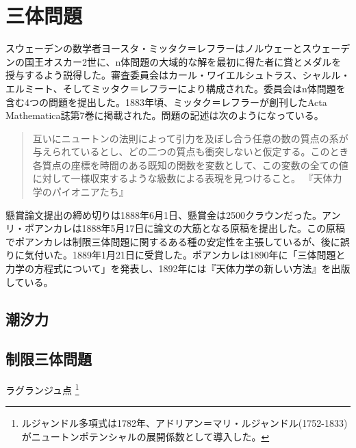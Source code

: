 \section{三体問題}
	スウェーデンの数学者ヨースタ・ミッタク＝レフラーはノルウェーとスウェーデンの国王オスカー2世に、n体問題の大域的な解を最初に得た者に賞とメダルを授与するよう説得した。審査委員会はカール・ワイエルシュトラス、シャルル・エルミート、そしてミッタク＝レフラーにより構成された。委員会はn体問題を含む4つの問題を提出した。1883年頃、ミッタク＝レフラーが創刊したActa Mathematica誌第7巻に掲載された。問題の記述は次のようになっている。
	\begin{quotation}
		互いにニュートンの法則によって引力を及ぼし合う任意の数の質点の系が与えられているとし、どの二つの質点も衝突しないと仮定する。このとき各質点の座標を時間のある既知の関数を変数として、この変数の全ての値に対して一様収束するような級数による表現を見つけること。
		\hfill 『天体力学のパイオニアたち』
	\end{quotation}
	懸賞論文提出の締め切りは1888年6月1日、懸賞金は2500クラウンだった。アンリ・ポアンカレは1888年5月17日に論文の大筋となる原稿を提出した。この原稿でポアンカレは制限三体問題に関するある種の安定性を主張しているが、後に誤りに気付いた。1889年1月21日に受賞した。ポアンカレは1890年に「三体問題と力学の方程式について」を発表し、1892年には『天体力学の新しい方法』を出版している。
	\subsection{潮汐力}
	\subsection{制限三体問題}
	ラグランジュ点
\footnote{
	ルジャンドル多項式は1782年、アドリアン＝マリ・ルジャンドル(1752-1833)がニュートンポテンシャルの展開係数として導入した。
}